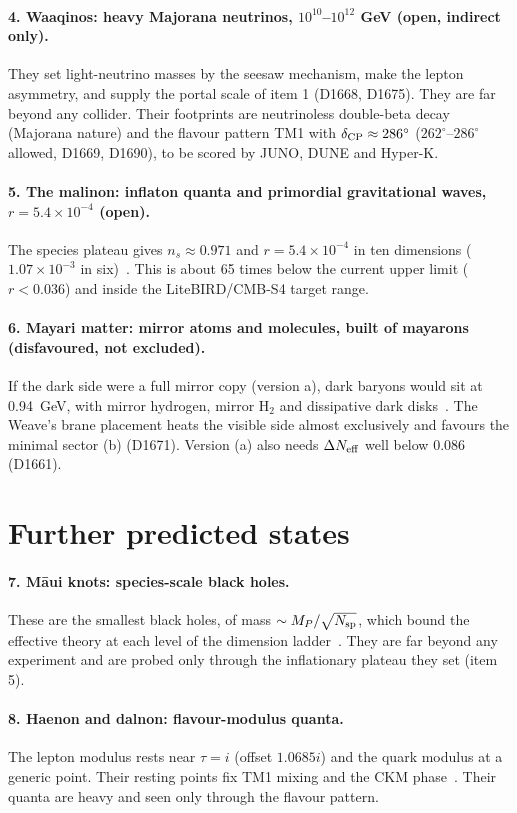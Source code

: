 \documentclass[aps,prd,twocolumn,superscriptaddress,nofootinbib,showkeys]{revtex4-2}
\begin{document}
\paragraph*{4. Waaqinos: heavy Majorana neutrinos, $10^{10}$--$10^{12}$ GeV (open, indirect only).}
They set light-neutrino masses by the seesaw mechanism, make the lepton asymmetry, and supply the portal scale of item 1 (D1668, D1675). They are far beyond any collider. Their footprints are neutrinoless double-beta decay (Majorana nature) and the flavour pattern TM1 with $\delta_{\rm CP}\approx286^\circ$ ($262^\circ$--$286^\circ$ allowed, D1669, D1690), to be scored by JUNO, DUNE and Hyper-K.

\paragraph*{5. The malinon: inflaton quanta and primordial gravitational waves, $r=5.4\times10^{-4}$ (open).}
The species plateau gives $n_s\approx0.971$ and $r=5.4\times10^{-4}$ in ten dimensions ($1.07\times10^{-3}$ in six)~\cite{P1}. This is about 65 times below the current upper limit ($r<0.036$) and inside the LiteBIRD/CMB-S4 target range.

\paragraph*{6. Mayari matter: mirror atoms and molecules, built of mayarons (disfavoured, not excluded).}
If the dark side were a full mirror copy (version a), dark baryons would sit at 0.94~GeV, with mirror hydrogen, mirror H$_2$ and dissipative dark disks~\cite{ADMrev}. The Weave's brane placement heats the visible side almost exclusively and favours the minimal sector (b) (D1671). Version (a) also needs $\Delta N_{\rm eff}$ well below 0.086 (D1661).

\section{Further predicted states}
\paragraph*{7. Māui knots: species-scale black holes.} These are the smallest black holes, of mass $\sim M_P/\sqrt{N_{\rm sp}}$, which bound the effective theory at each level of the dimension ladder~\cite{P1}. They are far beyond any experiment and are probed only through the inflationary plateau they set (item 5).
\paragraph*{8. Haenon and dalnon: flavour-modulus quanta.} The lepton modulus rests near $\tau=i$ (offset $1.0685i$) and the quark modulus at a generic point. Their resting points fix TM1 mixing and the CKM phase~\cite{FL}. Their quanta are heavy and seen only through the flavour pattern.
\end{document}
